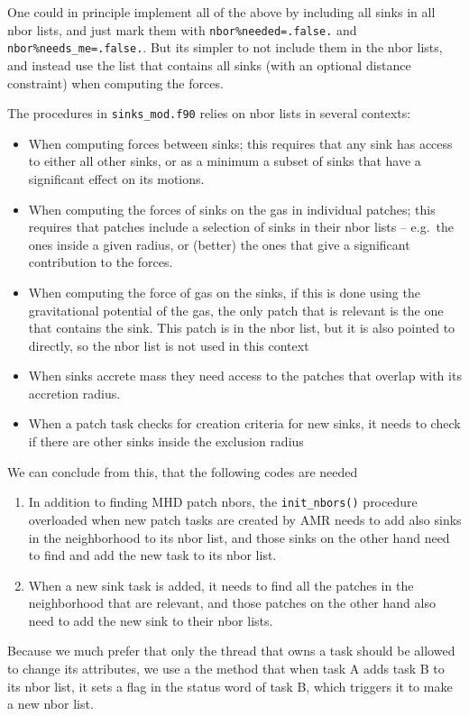 \documentclass[paper=a4,fontsize=11pt]{scrartcl}
\numberwithin{equation}{section}		%
\numberwithin{figure}{section}			%
\numberwithin{table}{section}				%
\newcommand{\codecolor}{\color{Blue}}
\newcommand{\filecolor}{\color{NavyBlue}}
\newcommand{\File}[1]{{\filecolor\texttt{#1}}}
\newcommand{\Code}[1]{{\codecolor\texttt{#1}}}
\begin{document}
One could in principle implement all of the above by including all sinks in all nbor lists, and just mark them with \verb|nbor%needed=.false.| and \verb|nbor%needs_me=.false.|.  But its simpler to not include them in the nbor lists, and instead use the list that contains all sinks (with an optional distance constraint) when computing the forces.

The procedures in \File{sinks\_mod.f90} relies on nbor lists in several contexts:
\begin{itemize}
    \item When computing forces between sinks; this requires that any sink has access to either all other sinks, or as a minimum a subset of sinks that have a significant effect on its motions.
    \item When computing the forces of sinks on the gas in individual patches; this requires that patches include a selection of sinks in their nbor lists -- e.g.\ the ones inside a given radius, or (better) the ones that give a significant contribution to the forces.
    \item When computing the force of gas on the sinks, if this is done using the gravitational potential of the gas, the only patch that is relevant is the one that contains the sink.  This patch is in the nbor list, but it is also pointed to directly, so the nbor list is not used in this context
    \item When sinks accrete mass they need access to the patches that overlap with its accretion radius.
    \item When a patch task checks for creation criteria for new sinks, it needs to check if there are other sinks inside the exclusion radius
\end{itemize}
We can conclude from this, that the following codes are needed
\begin{enumerate}
    \item In addition to finding MHD patch nbors, the \Code{init\_nbors()} procedure overloaded when new patch tasks are created by AMR needs to add also sinks in the neighborhood to its nbor list, and those sinks on the other hand need to find and add the new task to its nbor list.
    \item When a new sink task is added, it needs to find all the patches in the neighborhood that are relevant, and those patches on the other hand also need to add the new sink to their nbor lists.
\end{enumerate}
Because we much prefer that only the thread that owns a task should be allowed to change its attributes, we use a the method that when task A adds task B to its nbor list, it sets a flag in the status word of task B, which triggers it to make a new nbor list.
\end{document}
